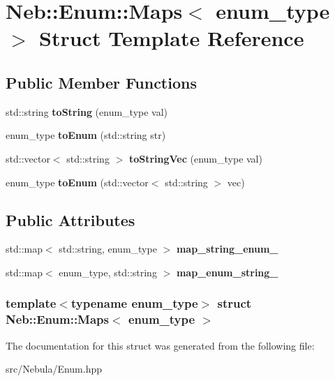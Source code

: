 \hypertarget{structNeb_1_1Enum_1_1Maps}{\section{\-Neb\-:\-:\-Enum\-:\-:\-Maps$<$ enum\-\_\-type $>$ \-Struct \-Template \-Reference}
\label{structNeb_1_1Enum_1_1Maps}
}
\subsection*{\-Public \-Member \-Functions}
\begin{DoxyCompactItemize}
\item 
\hypertarget{structNeb_1_1Enum_1_1Maps_ac9e855809a6118d50ca6d0b9a24f80a9}{std\-::string {\bfseries to\-String} (enum\-\_\-type val)}\label{structNeb_1_1Enum_1_1Maps_ac9e855809a6118d50ca6d0b9a24f80a9}

\item 
\hypertarget{structNeb_1_1Enum_1_1Maps_a716d4db5d843605cdf44a9687aca4779}{enum\-\_\-type {\bfseries to\-Enum} (std\-::string str)}\label{structNeb_1_1Enum_1_1Maps_a716d4db5d843605cdf44a9687aca4779}

\item 
\hypertarget{structNeb_1_1Enum_1_1Maps_af9858502b1b91eb41ff71c4d7e4fbc88}{std\-::vector$<$ std\-::string $>$ {\bfseries to\-String\-Vec} (enum\-\_\-type val)}\label{structNeb_1_1Enum_1_1Maps_af9858502b1b91eb41ff71c4d7e4fbc88}

\item 
\hypertarget{structNeb_1_1Enum_1_1Maps_a21e77595988229f4555999a0c9231432}{enum\-\_\-type {\bfseries to\-Enum} (std\-::vector$<$ std\-::string $>$ vec)}\label{structNeb_1_1Enum_1_1Maps_a21e77595988229f4555999a0c9231432}

\end{DoxyCompactItemize}
\subsection*{\-Public \-Attributes}
\begin{DoxyCompactItemize}
\item 
\hypertarget{structNeb_1_1Enum_1_1Maps_ad09edc976795064126040e7450a717e0}{std\-::map$<$ std\-::string, enum\-\_\-type $>$ {\bfseries map\-\_\-string\-\_\-enum\-\_\-}}\label{structNeb_1_1Enum_1_1Maps_ad09edc976795064126040e7450a717e0}

\item 
\hypertarget{structNeb_1_1Enum_1_1Maps_a6dadfc6e102d6a2c01a42fb91aed2bb9}{std\-::map$<$ enum\-\_\-type, std\-::string $>$ {\bfseries map\-\_\-enum\-\_\-string\-\_\-}}\label{structNeb_1_1Enum_1_1Maps_a6dadfc6e102d6a2c01a42fb91aed2bb9}

\end{DoxyCompactItemize}
\subsubsection*{template$<$typename enum\-\_\-type$>$ struct Neb\-::\-Enum\-::\-Maps$<$ enum\-\_\-type $>$}



\-The documentation for this struct was generated from the following file\-:\begin{DoxyCompactItemize}
\item 
src/\-Nebula/\-Enum.\-hpp\end{DoxyCompactItemize}
